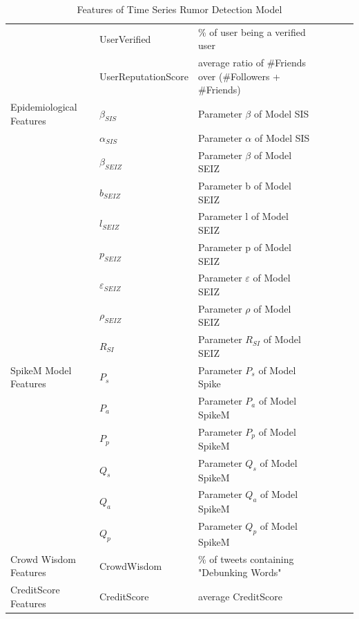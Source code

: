 \begin{table}[!h]
{\begin{tabular}{@{}lllllll@{}}
\\
 	& UserVerified  & \% of user being a verified user\cite{yang2012automatic}\cite{liu2015real}
\\
 	& UserReputationScore & average ratio of \#Friends over (\#Followers + \#Friends) \cite{liu2015real}\\   \midrule
 Epidemiological Features & $\beta_{SIS}$ & Parameter $\beta$ of Model SIS \cite{jin2013epidemiological}\\
 							& $\alpha_{SIS} $ & Parameter $\alpha$ of Model SIS \cite{jin2013epidemiological}\\
 							& $\beta_{SEIZ}$ & Parameter $\beta$ of Model SEIZ \cite{jin2013epidemiological}\\
 							& $b_{SEIZ}$ & Parameter b of Model SEIZ\cite{jin2013epidemiological}\\
 							& $l_{SEIZ}$ & Parameter l of Model SEIZ \cite{jin2013epidemiological}\\
 							& $p_{SEIZ}$ & Parameter p of Model SEIZ \cite{jin2013epidemiological}\\
 							& $\varepsilon_{SEIZ}$ & Parameter $\varepsilon$ of Model SEIZ \cite{jin2013epidemiological}\\
 							& $\rho_{SEIZ}$ & Parameter $\rho$ of Model SEIZ \cite{jin2013epidemiological}\\
 							& $R_{SI}$ & Parameter $R_{SI}$ of Model SEIZ \cite{jin2013epidemiological}\\
		\midrule	
 SpikeM Model Features & $P_s$ & Parameter $P_s$ of Model Spike \cite{kwon2013prominent}\\
 							& $P_a$ & Parameter $P_a$ of Model SpikeM \cite{kwon2013prominent}\\
 							& $P_p$ & Parameter $P_p$ of Model SpikeM \cite{kwon2013prominent}\\
 							& $Q_s$  & Parameter $Q_s$ of Model SpikeM \cite{kwon2013prominent}\\
 							& $Q_a$ & Parameter $Q_a$ of Model SpikeM \cite{kwon2013prominent}\\
 							& $Q_p$ & Parameter $Q_p$ of Model SpikeM \cite{kwon2013prominent}\\ \midrule	
 Crowd Wisdom Features & CrowdWisdom & \% of tweets containing "Debunking Words" \cite{liu2015real} \cite{zhao2015enquiring}\\ \midrule
 CreditScore Features & CreditScore & average CreditScore\\
 \bottomrule
 \end{tabular}}
 \caption{Features of Time Series Rumor Detection Model}
 \label{tab:full_features}
\end{table}
\clearpage
